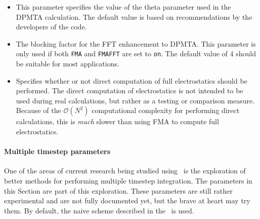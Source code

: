 \begin{itemize}
\item
{}
{This parameter specifies the value of the theta parameter
used in the DPMTA calculation.  The default value is based on
recommendations by the developers of the code.}

\item
{}
{The blocking factor for the FFT enhancement to DPMTA.
This parameter is only used if both \verb!FMA! and \verb!FMAFFT! 
are set to \verb!on!.  The default value of 4 should be suitable
for most applications.}

\item
{}
{Specifies whether or not direct computation of 
full electrostatics should be performed.  
The direct computation of electrostatics 
is not intended to be used during 
real calculations, but rather as a testing or 
comparison measure.  Because of the ${\mathcal O}(N^2)$ 
computational complexity for performing 
direct calculations, this is {\it much} 
slower than using FMA to compute full 
electrostatics.}

\end{itemize}

\paragraph{Multiple timestep parameters}

One of the areas of current research being studied using \NAMD\ is the
exploration of better methods for performing multiple timestep integration.
The parameters in this Section are part of this exploration.  These parameters
are still rather experimental and are not fully documented yet, but the
brave at heart may try them.  By default, the naive scheme described
in the \PG\ is used.

